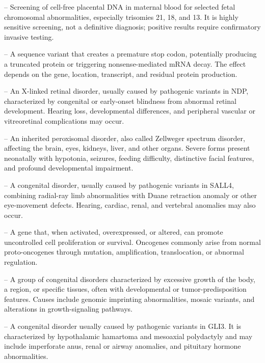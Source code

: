 -- Screening of cell-free placental DNA in maternal blood for selected fetal chromosomal abnormalities, especially trisomies 21, 18, and 13. It is highly sensitive screening, not a definitive diagnosis; positive results require confirmatory invasive testing.

-- A sequence variant that creates a premature stop codon, potentially producing a truncated protein or triggering nonsense-mediated mRNA decay. The effect depends on the gene, location, transcript, and residual protein production.

-- An X-linked retinal disorder, usually caused by pathogenic variants in NDP, characterized by congenital or early-onset blindness from abnormal retinal development. Hearing loss, developmental differences, and peripheral vascular or vitreoretinal complications may occur.

-- An inherited peroxisomal disorder, also called Zellweger spectrum disorder, affecting the brain, eyes, kidneys, liver, and other organs. Severe forms present neonatally with hypotonia, seizures, feeding difficulty, distinctive facial features, and profound developmental impairment.

-- A congenital disorder, usually caused by pathogenic variants in SALL4, combining radial-ray limb abnormalities with Duane retraction anomaly or other eye-movement defects. Hearing, cardiac, renal, and vertebral anomalies may also occur.

-- A gene that, when activated, overexpressed, or altered, can promote uncontrolled cell proliferation or survival. Oncogenes commonly arise from normal proto-oncogenes through mutation, amplification, translocation, or abnormal regulation.

-- A group of congenital disorders characterized by excessive growth of the body, a region, or specific tissues, often with developmental or tumor-predisposition features. Causes include genomic imprinting abnormalities, mosaic variants, and alterations in growth-signaling pathways.

-- A congenital disorder usually caused by pathogenic variants in GLI3. It is characterized by hypothalamic hamartoma and mesoaxial polydactyly and may include imperforate anus, renal or airway anomalies, and pituitary hormone abnormalities.

